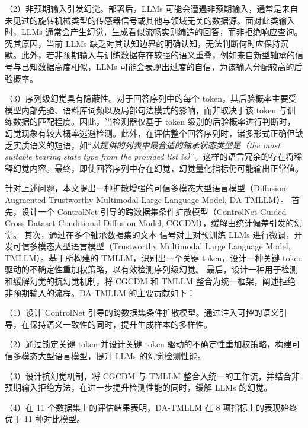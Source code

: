 （2）非预期输入引发幻觉。部署后，LLMs 可能会遭遇非预期输入，通常是来自未见过的旋转机械类型的传感器信号或其他与领域无关的数据源。面对此类输入时，LLMs 通常会产生幻觉，生成看似流畅实则编造的回答，而非拒绝响应查询。究其原因，当前 LLMs 缺乏对其认知边界的明确认知，无法判断何时应保持沉默。此外，若非预期输入与训练数据存在较强的语义重叠，例如来自新型轴承的信号与已知数据高度相似，LLMs 可能会表现出过度的自信，为该输入分配较高的后验概率。

（3）序列级幻觉具有隐蔽性。对于回答序列中的每个 token，其后验概率主要受模型内部先验、语料库词频以及局部句法模式的影响，而非取决于该 token 与训练数据的匹配程度。因此，当检测器仅基于 token 级别的后验概率进行判断时，幻觉现象有较大概率逃避检测。此外，在评估整个回答序列时，诸多形式正确但缺乏实质语义的短语，如“\textit{从提供的列表中最合适的轴承状态类型是（the most suitable bearing state type from the provided list is）}”。这样的语言冗余的存在将稀释幻觉内容。最终，即使回答序列中存在幻觉，幻觉量化指标仍可能输出正常值。

针对上述问题，本文提出一种扩散增强的可信多模态大型语言模型（Diffusion-Augmented Trustworthy Multimodal Large Language Model, DA-TMLLM）。
首先，设计一个 ControlNet 引导的跨数据集条件扩散模型（ControlNet-Guided Cross-Dataset Conditional Diffusion Model, CGCDM），缓解由统计偏差引发的幻觉。
其次，通过在多个轴承数据集的文本-信号对上对预训练 LLMs 进行微调，开发可信多模态大型语言模型（Trustworthy Multimodal Large Language Model, TMLLM）。基于所构建的 TMLLM，识别出一个关键 token，设计一种关键 token 驱动的不确定性重加权策略，以有效检测序列级幻觉。
最后，设计一种用于检测和缓解幻觉的抗幻觉机制，将 CGCDM 和 TMLLM 整合为统一框架，阐述拒绝非预期输入的流程。DA-TMLLM 的主要贡献如下：

（1）设计 ControlNet 引导的跨数据集条件扩散模型。通过注入可控的语义引导，在保持语义一致性的同时，提升生成样本的多样性。

（2）通过锁定关键 token 并设计关键 token 驱动的不确定性重加权策略，构建可信多模态大型语言模型，提升 LLMs 的幻觉检测性能。

（3）设计抗幻觉机制，将 CGCDM 与 TMLLM 整合入统一的工作流，并结合非预期输入拒绝方法，在进一步提升检测性能的同时，缓解 LLMs 的幻觉。

（4）在 11 个数据集上的评估结果表明，DA-TMLLM 在 8 项指标上的表现始终优于 11 种对比模型。

